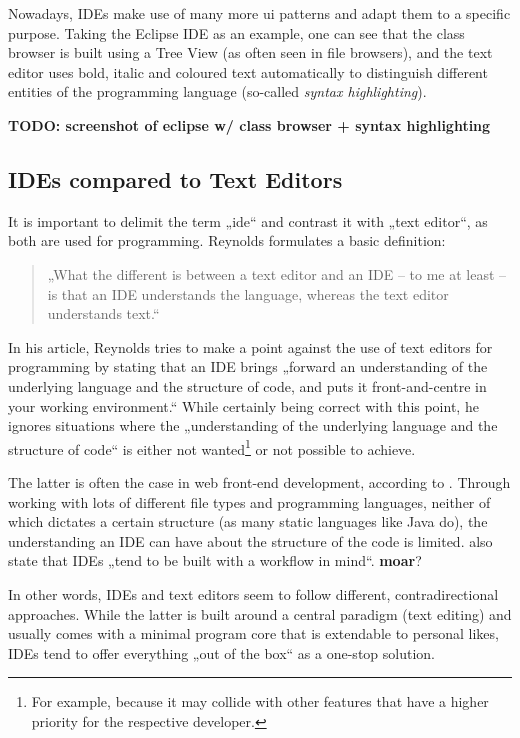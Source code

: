 Nowadays, IDEs make use of many more \gls{ui} patterns and adapt them to
a specific purpose. Taking the Eclipse IDE as an example, one can see
that the class browser is built using a Tree View (as often seen in file
browsers), and the text editor uses bold, italic and coloured text
automatically to distinguish different entities of the programming
language (so-called \emph{syntax highlighting}).

\textbf{TODO: screenshot of eclipse w/ class browser + syntax
highlighting}

\subsection{IDEs compared to Text
Editors}\label{ides-compared-to-text-editors}

It is important to delimit the term „\acl{ide}“ and contrast it with
„text editor“, as both are used for programming. Reynolds formulates a
basic definition:

\begin{quote}
„What the different is between a text editor and an IDE – to me at least
– is that an IDE understands the language, whereas the text editor
understands text.“ \citeyear{reynolds}
\end{quote}

In his article, Reynolds tries to make a point against the use of text
editors for programming by stating that an IDE brings „forward an
understanding of the underlying language and the structure of code, and
puts it front-and-centre in your working environment.“ \cite{reynolds}
While certainly being correct with this point, he ignores situations
where the „understanding of the underlying language and the structure of
code“ is either not
wanted\footnote{For example, because it may collide with other features that have a higher priority for the respective developer.}
or not possible to achieve.

The latter is often the case in web front-end development, according to
. Through working with lots of different file types
and programming languages, neither of which dictates a certain structure
(as many static languages like Java do), the understanding an IDE can
have about the structure of the code is limited.  also
state that IDEs „tend to be built with a workflow in mind“.
\textbf{moar}?

In other words, IDEs and text editors seem to follow different,
contradirectional approaches. While the latter is built around a central
paradigm (text editing) and usually comes with a minimal program core
that is extendable to personal likes, IDEs tend to offer everything „out
of the box“ as a one-stop solution.

